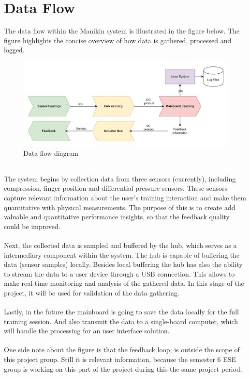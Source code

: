 \section {Data Flow}
The data flow within the Manikin system is illustrated in the figure below. The figure highlights the concise overview of how data is gathered, processed and logged. 
\begin{figure}[h!]
 \includegraphics[scale=0.075]{figures/System Dataflow overview.jpg}
 \caption{Data flow diagram}
\end{figure}\\
The system begins by collection data from three sensors (currently), including compression, finger position and differential pressure sensors. These sensors capture relevant information about the user's training interaction and make them quantitative with physical measurements. The purpose of this is to create add valuable and quantitative performance insights, so that the feedback quality could be improved. \\\\
Next, the collected data is sampled and buffered by the hub, which serves as a intermediary component within the system. The hub is capable of buffering the data (sensor samples) locally. Besides local buffering the hub has also the ability to stream the data to a user device through a USB connection. This allows to make real-time monitoring and analysis of the gathered data. In this stage of the project, it will be used for validation of the data gathering.\\\\
Lastly, in the future the mainboard is going to save the data locally for the full training session. And also transmit the data to a single-board computer, which will handle the processing for an user interface solution. 
\\\\
One side note about the figure is that the feedback loop, is outside the scope of this project group. Still it is relevant information, because the semester 6 ESE group is working on this part of the project during this the same project period.  
